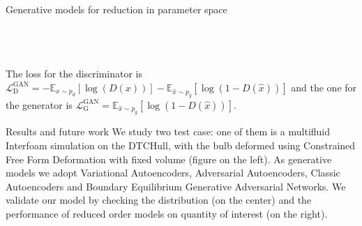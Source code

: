 \documentclass[b0paper,portrait]{baposter}
\begin{document}
\begin{poster}
\begin{posterbox}[name=vae,below=workflow,span=6,column=0]{Generative models for reduction in parameter space}
\begin{itemize}
 \\
\null \\
\null\\
The loss for the discriminator is $ 
 \mathcal{L}_{\mathrm{D}}^{\mathrm{GAN}}=-\mathbb{E}_{x \sim p_{d}}[\log (D(x))]-\mathbb{E}_{\hat{x} \sim p_{g}}[\log (1-D(\hat{x}))]$ and the one for the generator is $\mathcal{L}_{\mathrm{G}}^{\mathrm{GAN}}=\mathbb{E}_{\hat{x} \sim p_{g}}[\log (1-D(\hat{x}))]$.
\end{itemize}
\end{posterbox}

\begin{posterbox}[name=results,below=vae,span=6,column=0]{Results and future work}
We study two test case: one of them is a multifluid Interfoam simulation on the DTCHull, with the bulb deformed using Constrained Free Form Deformation with fixed volume (figure on the left).
As generative models we adopt Variational Autoencoders, Adversarial Autoencoders, Classic Autoencoders and Boundary Equilibrium Generative Adversarial Networks. We validate our model by checking the distribution (on the center) and the performance of reduced order models on quantity of interest (on the right).\\
\hfill\\

\end{posterbox}
\end{poster}
\end{document}
